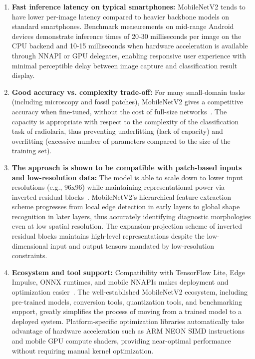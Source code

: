 \documentclass[a4paper,fleqn]{cas-sc}
\begin{document}
\begin{enumerate}
Energy profiling analysis of mobile processors has revealed that the MobileNetV2-based inference always tends to consume 30-40\% less energy for classification compared to ResNet-based models. This helps in easy extension of the operating period during multi-day expeditions in the field, where there are no charging facilities available. The energy-saving benefit will be more noticeable in the case of continuous inference tasks, such as real-time video stream processing for automatic specimen scanning.
  \item \textbf{Fast inference latency on typical smartphones:} MobileNetV2 tends to have lower per-image latency compared to heavier backbone models on standard smartphones. Benchmark measurements on mid-range Android devices demonstrate inference times of 20-30 milliseconds per image on the CPU backend and 10-15 milliseconds when hardware acceleration is available through NNAPI or GPU delegates, enabling responsive user experience with minimal perceptible delay between image capture and classification result display.
  \item \textbf{Good accuracy vs. complexity trade-off:} For many small-domain tasks (including microscopy and fossil patches), MobileNetV2 gives a competitive accuracy when fine-tuned, without the cost of full-size networks~\cite{sandler2018mobilenetv2}. The capacity is appropriate with respect to the complexity of the classification task of radiolaria, thus preventing underfitting (lack of capacity) and overfitting (excessive number of parameters compared to the size of the training set).
  \item \textbf{The approach is shown to be compatible with patch-based inputs and low-resolution data:} The model is able to scale down to lower input resolutions (e.g., 96x96) while maintaining representational power via inverted residual blocks~\cite{sandler2018mobilenetv2}. MobileNetV2's hierarchical feature extraction scheme progresses from local edge detection in early layers to global shape recognition in later layers, thus accurately identifying diagnostic morphologies even at low spatial resolution. The expansion-projection scheme of inverted residual blocks maintains high-level representations despite the low-dimensional input and output tensors mandated by low-resolution constraints.
  \item \textbf{Ecosystem and tool support:} Compatibility with TensorFlow Lite, Edge Impulse, ONNX runtimes, and mobile NNAPIs makes deployment and optimization easier~\cite{warden2019tinyml}. The well-established MobileNetV2 ecosystem, including pre-trained models, conversion tools, quantization tools, and benchmarking support, greatly simplifies the process of moving from a trained model to a deployed system. Platform-specific optimization libraries automatically take advantage of hardware acceleration such as ARM NEON SIMD instructions and mobile GPU compute shaders, providing near-optimal performance without requiring manual kernel optimization.

\end{enumerate}
\end{document}
